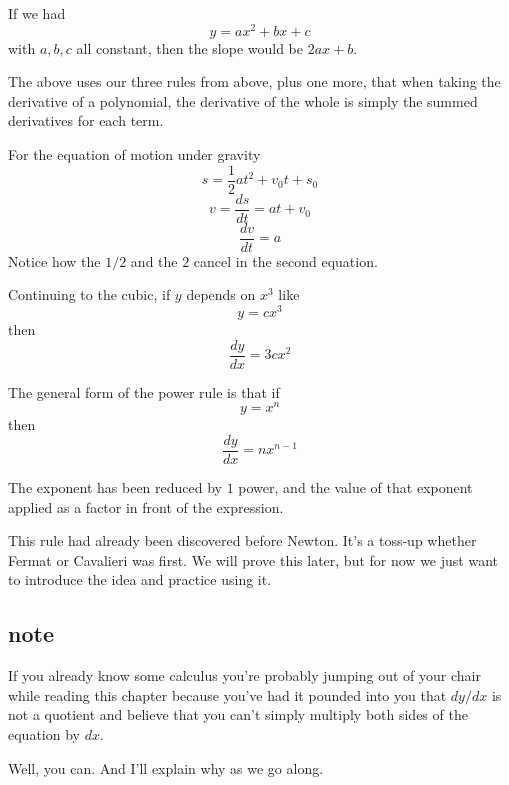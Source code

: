 \documentclass[11pt, oneside]{article}
\begin{document}
If we had
\[ y = ax^2 + bx + c \]
with $a,b,c$ all constant, then the slope would be $2ax + b$.  

The above uses our three rules from above, plus one more, that when taking the derivative of a polynomial, the derivative of the whole is simply the summed derivatives for each term.

For the equation of motion under gravity
\[ s = \frac{1}{2} a t^2 + v_0 t + s_0 \]
\[ v = \frac{ds}{dt} = at + v_0 \]
\[ \frac{dv}{dt} = a \]
Notice how the $1/2$ and the $2$ cancel in the second equation.

Continuing to the cubic, if $y$ depends on $x^3$ like
\[ y = cx^3 \]
then
\[ \frac{dy}{dx} = 3cx^2 \]

The general form of the power rule is that if
\[ y = x^n \]
then
\[ \frac{dy}{dx} = n x^{n-1} \]

The exponent has been reduced by $1$ power, and the value of that exponent applied as a factor in front of the expression.

This rule had already been discovered before Newton.  It's a toss-up whether Fermat or Cavalieri was first.  We will prove this later, but for now we just want to introduce the idea and practice using it.

\subsection*{note}
If you already know some calculus you're probably jumping out of your chair while reading this chapter because you've had it pounded into you that $dy/dx$ is not a quotient and believe that you can't simply multiply both sides of the equation by $dx$.

Well, you can.  And I'll explain why as we go along.
\end{document}
